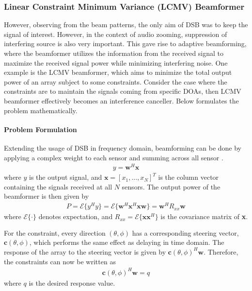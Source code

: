 \documentclass[a4paper,twoside,12pt,hidelinks]{article}
\begin{document}
\subsubsection{Linear Constraint Minimum Variance (LCMV) Beamformer}
\label{sect:adaptivebeamformer}
However, observing from the beam patterns, the only aim of DSB was to keep the signal of interest. However, in the context of audio zooming, suppression of interfering source is also very important. This gave rise to  adaptive beamforming, where the beamformer utilizes the information from the received signal to maximize the received signal power while minimizing interfering noise. One example is the LCMV beamformer, which aims to minimize the total output power of an array subject to some constraints. Consider the case where the constraints are to maintain the signals coming from specific DOAs, then LCMV beamformer effectively becomes an interference canceller. Below formulates the problem mathematically.

\paragraph{Problem Formulation}
Extending the usage of DSB in frequency domain, beamforming can be done by applying a complex weight to each sensor and summing across all sensor \cite{Habets2009OnEnhancement}. 
\begin{align}
y=\textbf{w}^H\textbf{x}
\end{align}
where $y$ is the output signal, and $\textbf{x}=[x_1,...,x_N]^T$ is the column vector containing the signals received at all $N$ sensors. The output power of the beamformer is then given by
\begin{align}
P = \mathcal{E}\{y^Hy\}=\mathcal{E}\{\textbf{w}^H\textbf{x}^H\textbf{x}\textbf{w}\}=\textbf{w}^HR_{xx}\textbf{w}
\end{align}
where $\mathcal{E}\{\cdot\}$ denotes expectation, and $R_{xx}=\mathcal{E}\{\textbf{x}\textbf{x}^H\}$ is the covariance matrix of \textbf{x}.

For the constraint, every direction $(\theta,\phi)$ has a corresponding steering vector, $\textbf{c}(\theta,\phi)$, which performs the same effect as delaying in time domain. The response of the array to the steering vector is given by $\textbf{c}(\theta,\phi)^H\textbf{w}$. Therefore, the constraints can now be written as
\begin{align}
\textbf{c}(\theta,\phi)^H\textbf{w}=q
\end{align}
where $q$ is the desired response value. 
\end{document}
